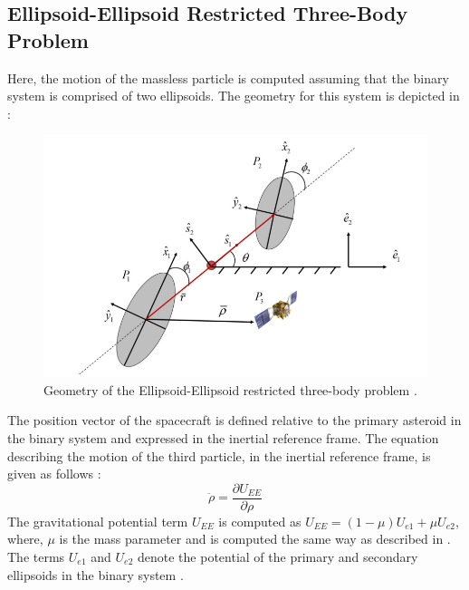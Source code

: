 \subsection{Ellipsoid-Ellipsoid Restricted Three-Body Problem}
\label{EERTBP}
Here, the motion of the massless particle is computed assuming that the binary system is comprised of two ellipsoids. The geometry for this system is depicted in :
\begin{figure}[h]
\centering
\captionsetup{justification=centering}
\includegraphics[scale=0.5]{eertbp.png}
\caption{Geometry of the Ellipsoid-Ellipsoid restricted three-body problem \cite{chappaz}.}
\label{fig:eertbp}
\end{figure}
\FloatBarrier
%
The position vector of the spacecraft is defined relative to the primary asteroid in the binary system and expressed in the inertial reference frame. The equation describing the motion of the third particle, in the inertial reference frame, is given as follows \cite{chappaz}:
\begin{equation}
\label{eertbp_eom}
\ddot{\rho} = \frac{\partial U_{EE}}{\partial \rho}
\end{equation}
%
The gravitational potential term $U_{EE}$ is computed as $U_{EE} = (1-\mu)U_{e1} + \mu U_{e2}$, where, $\mu$ is the mass parameter and is computed the same way as described in . The terms $U_{e1}$ and $U_{e2}$ denote the potential of the primary and secondary ellipsoids in the binary system \cite{chappaz}.

